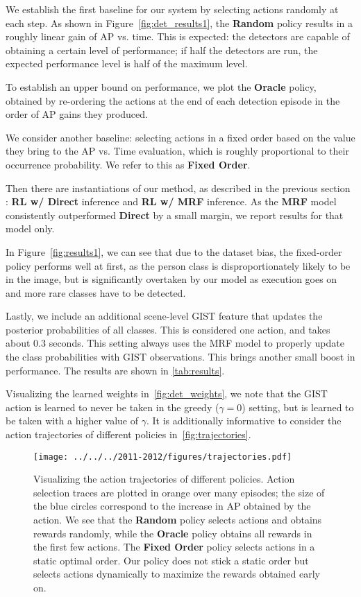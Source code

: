 We establish the first baseline for our system by selecting actions randomly at each step.
As shown in Figure~\autoref{fig:det_results1}, the \textbf{Random} policy results in a roughly linear gain of AP vs. time.
This is expected: the detectors are capable of obtaining a certain level of performance; if half the detectors are run, the expected performance level is half of the maximum level.

To establish an upper bound on performance, we plot the \textbf{Oracle} policy, obtained by re-ordering the actions at the end of each detection episode in the order of AP gains they produced.

We consider another baseline: selecting actions in a fixed order based on the value they bring to the AP vs. Time evaluation, which is roughly proportional to their occurrence probability.
We refer to this as \textbf{Fixed Order}.

Then there are instantiations of our method, as described in the previous section : \textbf{RL w/ Direct} inference and \textbf{RL w/ MRF} inference.
As the \textbf{MRF} model consistently outperformed \textbf{Direct} by a small margin, we report results for that model only.

In Figure~\autoref{fig:results1}, we can see that due to the dataset bias, the fixed-order policy performs well at first, as the person class is disproportionately likely to be in the image, but is significantly overtaken by our model as execution goes on and more rare classes have to be detected.

Lastly, we include an additional scene-level GIST feature that updates the posterior probabilities of all classes.
This is considered one action, and takes about $0.3$ seconds.
This setting always uses the MRF model to properly update the class probabilities with GIST observations.
This brings another small boost in performance.
The results are shown in \autoref{tab:results}.

Visualizing the learned weights in~\autoref{fig:det_weights}, we note that the GIST action is learned to never be taken in the greedy ($\gamma=0$) setting, but is learned to be taken with a higher value of $\gamma$.
It is additionally informative to consider the action trajectories of different policies in~\autoref{fig:trajectories}.

\begin{figure}[h!]
  \centering
  \texttt{[image: ../../../2011-2012/figures/trajectories.pdf]}
  \caption{
Visualizing the action trajectories of different policies.
Action selection traces are plotted in orange over many episodes; the size of the blue circles correspond to the increase in AP obtained by the action.
We see that the \textbf{Random} policy selects actions and obtains rewards randomly, while the \textbf{Oracle} policy obtains all rewards in the first few actions.
The \textbf{Fixed Order} policy selects actions in a static optimal order.
Our policy does not stick a static order but selects actions dynamically to maximize the rewards obtained early on.
}
  \label{fig:trajectories}
\end{figure}

